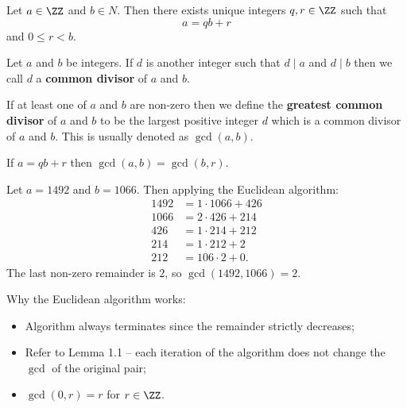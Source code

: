 \documentclass[12pt, a4paper]{article}
\begin{document}
\begin{theorem}
    Let \(a\in \ZZ\) and \(b\in N\). Then there exists unique integers \(q,r \in \ZZ\) such that 
    \[a = qb+r\]
    and \(0\leq r <b\).
\end{theorem}

\begin{definition}
Let \(a\) and \(b\) be integers. If \(d\) is another integer such that \(d\mid a\) and \(d\mid b\) then we call \(d\) a \textbf{common divisor} of \(a\) and \(b\).
\end{definition}

\begin{definition}
    If at least one of \(a\) and \(b\) are non-zero then we define the \textbf{greatest common divisor} of \(a\) and \(b\) to be the largest positive integer \(d\) which is a common divisor of \(a\) and \(b\). This is usually denoted as \(\gcd(a,b)\).
\end{definition}

\begin{lemma}
    If \(a=qb+r\) then \(\gcd(a,b)=\gcd(b,r)\).
\end{lemma}

\begin{mdexample}\label{ex: Euclidean algorithm}
Let \(a=1492\) and \(b=1066\). Then applying the Euclidean algorithm:
\[\begin{aligned}
    1492 &=1 \cdot 1066 +426 \\
    1066 &= 2 \cdot 426 +214 \\
    426 &= 1 \cdot 214 +212 \\
    214 &=1 \cdot 212 +2 \\
    212 &= 106 \cdot 2 +0.
\end{aligned}\]
The last non-zero remainder is \(2\), so \(\gcd(1492,1066)=2\).
\end{mdexample}

\begin{mdremark}
    Why the Euclidean algorithm works:
    \begin{itemize}
        \item Algorithm always terminates since the remainder strictly decreases;
        \item Refer to Lemma 1.1 -- each iteration of the algorithm does not change the \(\gcd\) of the original pair;
        \item \(\gcd(0,r)= r\) for \(r \in \ZZ\).
    \end{itemize}
\end{mdremark}
\end{document}
